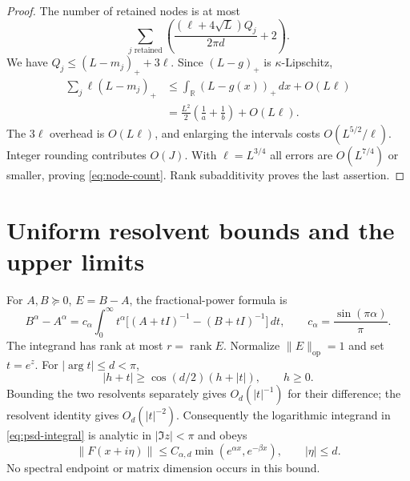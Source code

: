 \documentclass[11pt]{article}
\numberwithin{equation}{section}
\newcommand{\rank}{\operatorname{rank}}
\newcommand{\op}{\mathrm{op}}
\newcommand{\R}{\mathbb R}
\begin{document}
\begin{proof}
The number of retained nodes is at most
\[
 \sum_{j\text{ retained}}
       \left(\frac{(\ell+4\sqrt L)Q_j}{2\pi d}+2\right).
\]
We have $Q_j\le(L-m_j)_++3\ell$. Since $(L-g)_+$ is
$\kappa$-Lipschitz,
\begin{align*}
 \sum_j\ell(L-m_j)_+
 &\le\int_\R(L-g(x))_+\,dx+O(L\ell)\\
 &=\frac{L^2}{2}\left(\frac1a+\frac1b\right)+O(L\ell).
\end{align*}
The $3\ell$ overhead is $O(L\ell)$, and enlarging the intervals costs
$O(L^{5/2}/\ell)$. Integer rounding contributes $O(J)$.
With $\ell=L^{3/4}$ all errors are $O(L^{7/4})$ or smaller, proving
\eqref{eq:node-count}. Rank subadditivity proves the last assertion.
\end{proof}

\section{Uniform resolvent bounds and the upper limits}

For $A,B\succeq0$, $E=B-A$, the fractional-power formula is
\begin{equation}\label{eq:psd-integral}
 B^\alpha-A^\alpha
 =c_\alpha\int_0^\infty t^\alpha
       \big[(A+tI)^{-1}-(B+tI)^{-1}\big]\,dt,
 \qquad c_\alpha=\frac{\sin(\pi\alpha)}\pi.
\end{equation}
The integrand has rank at most $r=\rank E$.
Normalize $\|E\|_\op=1$ and set $t=e^z$. For $|\arg t|\le d<\pi$,
\[
 |h+t|\ge\cos(d/2)(h+|t|),\qquad h\ge0.
\]
Bounding the two resolvents separately gives $O_d(|t|^{-1})$ for
their difference; the resolvent identity gives $O_d(|t|^{-2})$.
Consequently the logarithmic integrand in \eqref{eq:psd-integral} is
analytic in $|\Im z|<\pi$ and obeys
\begin{equation}\label{eq:common-envelope}
 \|F(x+i\eta)\|\le C_{\alpha,d}
       \min(e^{\alpha x},e^{-\beta x}),\qquad |\eta|\le d.
\end{equation}
No spectral endpoint or matrix dimension occurs in this bound.
\end{document}
